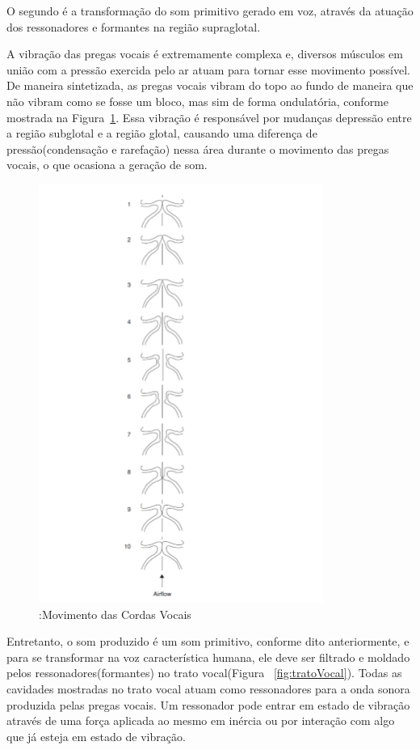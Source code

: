 	O segundo é a transformação do som primitivo gerado em voz, através da atuação dos ressonadores e formantes na região supraglotal.
	
	A vibração das pregas vocais é extremamente complexa e, diversos músculos em união com a pressão exercida pelo ar atuam para tornar esse movimento possível. De maneira sintetizada, as pregas vocais vibram do topo ao fundo de maneira que não vibram como se fosse um bloco, mas sim de forma ondulatória, conforme mostrada na Figura~\ref{fig:movimentoCordas}. Essa vibração é responsável por mudanças depressão entre a região subglotal e a região glotal, causando uma diferença de pressão(condensação e rarefação) nessa área durante o movimento das pregas vocais, o que ocasiona a geração de som.

	\begin{figure}
		\centering
		\includegraphics[scale=0.5]{movimentoCordas}
		\caption{:Movimento das Cordas Vocais ~\cite{Foundation1}}
		\label{fig:movimentoCordas}
	\end{figure}		
	
	Entretanto, o som produzido é um som primitivo, conforme dito anteriormente, e para se transformar na voz característica humana, ele deve ser ﬁltrado e moldado pelos ressonadores(formantes) no trato vocal(Figura ~\ref{fig:tratoVocal}).
	Todas as cavidades mostradas no trato vocal atuam como ressonadores para a onda sonora produzida pelas pregas vocais. Um ressonador pode entrar em estado de vibração através de uma força aplicada ao mesmo em inércia ou por interação com algo que já esteja em estado de vibração.
	
